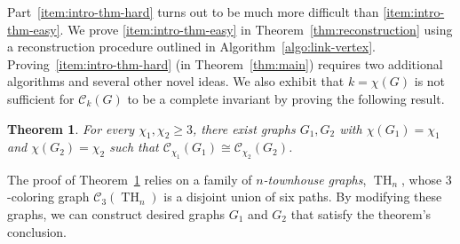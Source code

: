 \documentclass{amsart}
\theoremstyle{hypothesisstyle}
\newtheorem{theorem}{Theorem}[section]
\theoremstyle{definition}
\theoremstyle{remark}
\numberwithin{equation}{section}
\newcommand{\C}{\mathcal C}
\begin{document}
Part~\eqref{item:intro-thm-hard} turns out to be much more difficult than \eqref{item:intro-thm-easy}. We prove \eqref{item:intro-thm-easy} in Theorem~\ref{thm:reconstruction} using a reconstruction procedure outlined in Algorithm~\ref{algo:link-vertex}. Proving~\eqref{item:intro-thm-hard} (in Theorem~\ref{thm:main}) requires two additional algorithms and several other novel ideas. We also exhibit that $k=\chi(G)$ is not sufficient for $\mathcal{C}_k(G)$ to be a complete invariant by proving the following result. 

\begin{theorem}\label{thm:townhouse}
For every $\chi_1,\chi_2\ge 3$, there exist graphs $G_1,G_2$ with $\chi(G_1)=\chi_1$ and $\chi(G_2)=\chi_2$ such that $\C_{\chi_1}(G_1)\cong \C_{\chi_2}(G_2)$. 
\end{theorem}

The proof of Theorem~\ref{thm:townhouse} relies on a family of {\em $n$-townhouse graphs}, $\operatorname{TH}_n$, whose $3$-coloring graph $\mathcal{C}_3(\operatorname{TH}_n)$ is a disjoint union of six paths. By modifying these graphs, we can construct desired graphs $G_1$ and $G_2$ that satisfy the theorem's conclusion.
\end{document}
